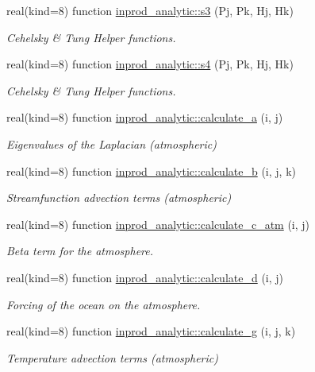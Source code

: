 \begin{DoxyCompactItemize}
real(kind=8) function \hyperlink{namespaceinprod__analytic_a671ca8c3aae1db0a453a13e94462baa0}{inprod\+\_\+analytic\+::s3} (Pj, Pk, Hj, Hk)
\begin{DoxyCompactList}\small\item\em Cehelsky \& Tung Helper functions. \end{DoxyCompactList}\item 
real(kind=8) function \hyperlink{namespaceinprod__analytic_a8dacf930ffdf8fd09da0a77bfd4d3a4b}{inprod\+\_\+analytic\+::s4} (Pj, Pk, Hj, Hk)
\begin{DoxyCompactList}\small\item\em Cehelsky \& Tung Helper functions. \end{DoxyCompactList}\item 
real(kind=8) function \hyperlink{namespaceinprod__analytic_afc3e503e1fd9774693f02e0fe87ec63a}{inprod\+\_\+analytic\+::calculate\+\_\+a} (i, j)
\begin{DoxyCompactList}\small\item\em Eigenvalues of the Laplacian (atmospheric) \end{DoxyCompactList}\item 
real(kind=8) function \hyperlink{namespaceinprod__analytic_a63625452db6424cf46aa93bb9ce3e2f2}{inprod\+\_\+analytic\+::calculate\+\_\+b} (i, j, k)
\begin{DoxyCompactList}\small\item\em Streamfunction advection terms (atmospheric) \end{DoxyCompactList}\item 
real(kind=8) function \hyperlink{namespaceinprod__analytic_aa242adb49ed57168cfd281c90ddd6490}{inprod\+\_\+analytic\+::calculate\+\_\+c\+\_\+atm} (i, j)
\begin{DoxyCompactList}\small\item\em Beta term for the atmosphere. \end{DoxyCompactList}\item 
real(kind=8) function \hyperlink{namespaceinprod__analytic_a519a70cc6ad55be09a56df9753e43e61}{inprod\+\_\+analytic\+::calculate\+\_\+d} (i, j)
\begin{DoxyCompactList}\small\item\em Forcing of the ocean on the atmosphere. \end{DoxyCompactList}\item 
real(kind=8) function \hyperlink{namespaceinprod__analytic_afa66e718a91ec595e483cb20befce6a6}{inprod\+\_\+analytic\+::calculate\+\_\+g} (i, j, k)
\begin{DoxyCompactList}\small\item\em Temperature advection terms (atmospheric) \end{DoxyCompactList}\item 

\end{DoxyCompactItemize}
